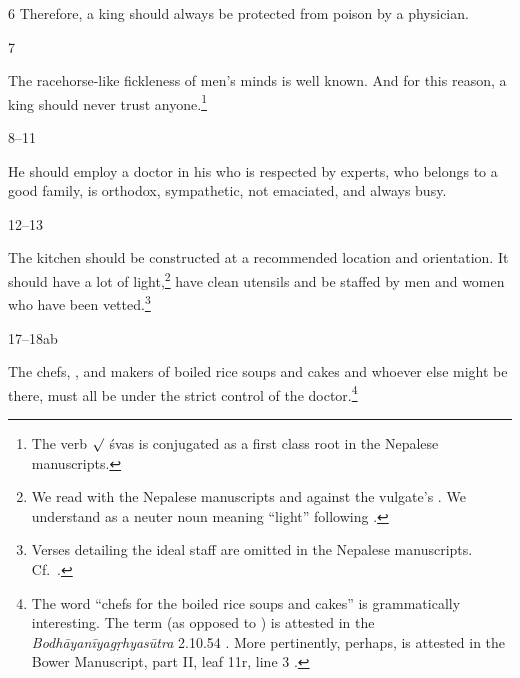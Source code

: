 \begin{translation}
\item[6] Therefore, a king should always be protected from poison by a physician.


\item [7] 

The racehorse-like fickleness of men's minds is well known. And for this reason, a
king should never trust anyone.\footnote{The verb $\surd$ śvas is conjugated as a
first class root in the Nepalese manuscripts.}

\item [8--11]

He should employ a doctor in his  who is respected by experts, who 
belongs to a good family, is orthodox, sympathetic, not emaciated, and always busy.

\item [12--13]

The kitchen should be constructed at a recommended location and orientation.  It should
have a lot of light,\footnote{We read  with the Nepalese manuscripts and 
against the vulgate's .  We understand  as a neuter noun 
meaning “light” following \citet[1050a]{apte-prac}.} have clean utensils and be staffed by 
men 
and
women who have been vetted.\footnote{Verses detailing the ideal staff are omitted in the 
Nepalese manuscripts. 
Cf.\ \cites[560]{vulgate}[132]{wuja-2003}.}


\item[17--18ab]

The chefs, , and makers of boiled rice soups and cakes and whoever
else might be there, must all be under the strict control of the
doctor.\footnote{The word  “chefs for the boiled rice soups
and cakes” is grammatically interesting.  The term  (as opposed to
) is attested in the \emph{Bodhāyanīya\-gṛhyasūtra} 2.10.54 
\citep[68]{shas-1920}.  More pertinently, perhaps,  is attested in
the Bower Manuscript, part II, leaf 11r, line 3 \citep[vol.\,1,
p.\,43]{hoer-bowe}.} 


\end{translation}
